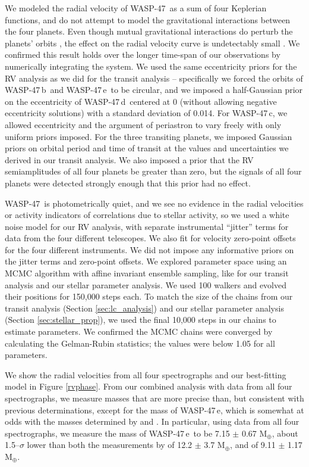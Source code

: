 \documentclass{emulateapj}
\newcommand{\thisstar}{WASP-47}
\newcommand{\thisfirstplanet}{WASP-47\,b}
\newcommand{\thissecondplanet}{WASP-47\,e}
\newcommand{\thisthirdplanet}{WASP-47\,d}
\newcommand{\thisfourthplanet}{WASP-47\,c}
\newcommand{\mearth}{M$_\oplus$}
\begin{document}
We modeled the radial velocity of \thisstar\ as a sum of four Keplerian functions, and do not attempt to model the gravitational interactions between the four planets. Even though mutual gravitational interactions do perturb the planets' orbits \citep{becker, almenara,weissw47}, the effect on the radial velocity curve is undetectably small \citep{dai, sinukoffw47}. We confirmed this result holds over the longer time-span of our observations by numerically integrating the system. We used the same eccentricity priors for the RV analysis as we did for the transit analysis -- specifically we forced the orbits of \thisfirstplanet\ and \thissecondplanet\ to be circular, and we imposed a half-Gaussian prior on the eccentricity of \thisthirdplanet\ centered at 0 (without allowing negative eccentricity solutions) with a standard deviation of 0.014. For \thisfourthplanet, we allowed eccentricity and the argument of periastron to vary freely with only uniform priors imposed. For the three transiting planets, we imposed Gaussian priors on orbital period and time of transit at the values and uncertainties we derived in our transit analysis. We also imposed a prior that the RV semiamplitudes of all four planets be greater than zero, but the signals of all four planets were detected strongly enough that this prior had no effect. 

\thisstar\ is photometrically quiet, and we see no evidence in the radial velocities or activity indicators of correlations due to stellar activity, so we used a white noise model for our RV analysis, with separate instrumental ``jitter'' terms for data from the four different telescopes. We also fit for velocity zero-point offsets for the four different instruments. We did not impose any informative priors on the jitter terms and zero-point offsets. We explored parameter space using an MCMC algorithm with affine invariant ensemble sampling, like for our transit analysis and our stellar parameter analysis. We used 100 walkers and evolved their positions for 150,000 steps each. To match the size of the chains from our transit analysis (Section \ref{sec:lc_analysis}) and our stellar parameter analysis (Section \ref{sec:stellar_prop}),  we used the final 10,000 steps in our chains to estimate parameters. We confirmed the MCMC chains were converged by calculating the Gelman-Rubin statistics; the values were below 1.05 for all parameters.   

We show the radial velocities from all four spectrographs and our best-fitting model in Figure \ref{rvphase}. From our combined analysis with data from all four spectrographs, we measure masses that are more precise than, but consistent with previous determinations, except for the mass of \thissecondplanet, which is somewhat at odds with the masses determined by \citet{dai} and \citet{sinukoffw47}. In particular, using data from all four spectrographs, we measure the mass of \thissecondplanet\ to be 7.15 $\pm$ 0.67 \mearth, about 1.5--$\sigma$ lower than both the measurements by \citet{dai} of 12.2 $\pm$ 3.7 \mearth, and \citet{sinukoffw47} of 9.11 $\pm$ 1.17 \mearth. 
\end{document}
